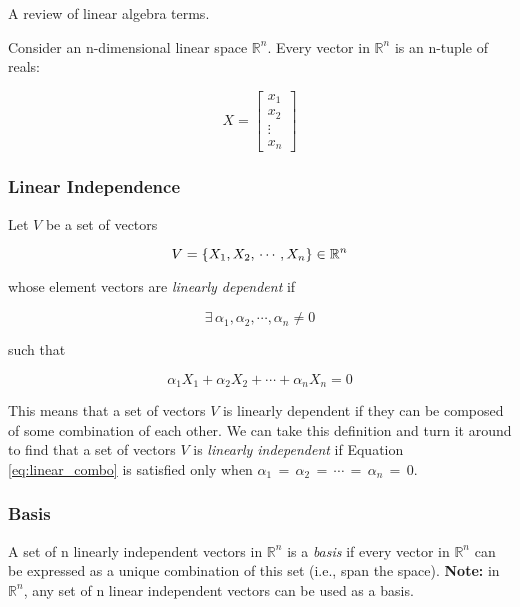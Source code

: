 A review of linear algebra terms.

Consider an n-dimensional linear space $\mathbb{R}^n$. Every vector in
$\mathbb{R}^n$ is an n-tuple of reals:

\begin{equation} \label{eq:n_tuple}
X =
\begin{bmatrix}
  x_1 \\ x_2 \\ \vdots \\ x_n
\end{bmatrix}
\end{equation}

\subsubsection{Linear Independence}

Let $V$ be a set of vectors

\begin{equation} \label{eq:set_of_vectors}
V = \{ X_1, \, \\ X_2, \, \\ \cdots, \, \\ X_n \} \in \mathbb{R}^n
\end{equation}

\noindent whose element vectors are \textit{linearly dependent} if

\begin{equation}
  \exists \, \alpha_1, \alpha_2, \cdots, \alpha_n \neq 0
\end{equation}

\noindent such that

\begin{equation} \label{eq:linear_combo}
\alpha_1 X_1 + \alpha_2 X_2 + \cdots + \alpha_n X_n = 0
\end{equation}

This means that a set of vectors $V$ is linearly dependent if they can be
composed of some combination of each other. We can take this definition and turn
it around to find that a set of vectors $V$ is \textit{linearly independent} if
Equation \ref{eq:linear_combo} is satisfied only when
$\alpha_1 \, = \, \alpha_2 \, = \, \cdots \, = \, \alpha_n \, = \, 0$.

\subsubsection{Basis}

A set of n linearly independent vectors in $\mathbb{R}^n$ is a \textit{basis}
if every vector in $\mathbb{R}^n$ can be expressed as a unique combination
of this set (i.e., span the space). \textbf{Note:} in $\mathbb{R}^n$, any set of
n linear independent vectors can be used as a basis.

